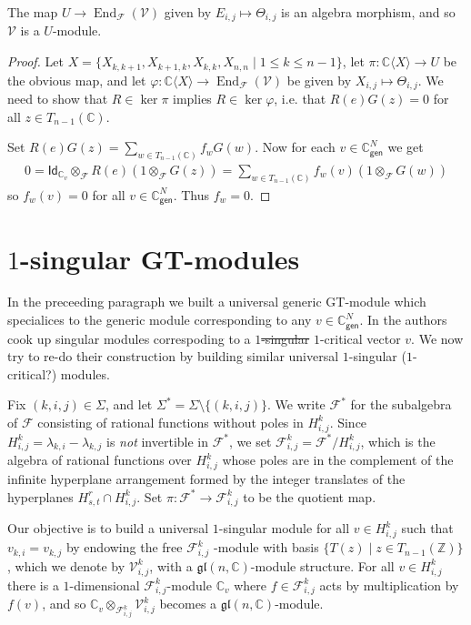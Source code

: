 \documentclass[11pt,fleqn]{article}
\newcommand\CC{\mathbb C}
\newcommand\ZZ{\mathbb Z}
\newcommand\F{\mathcal F}
\newcommand\V{\mathcal V}
\newcommand\ot{\otimes}
\renewcommand\to{\longrightarrow}
\renewcommand\phi{\varphi}
\newcommand\Id{\mathsf{Id}}
\newcommand\gl{\mathfrak{gl}}
\newcommand\gen{\mathsf{gen}}
\DeclareMathOperator\End{End}
\begin{document}
\begin{Proposition*}
The map $U \to \End_\F(\V)$ given by $E_{i,j} \mapsto \Theta_{i,j}$ is an 
algebra morphism, and so $\V$ is a $U$-module.
\end{Proposition*}
\begin{proof}
Let $X = \{X_{k,k+1}, X_{k+1,k}, X_{k,k}, X_{n,n} \mid 1 \leq k \leq n-1\}$, 
let $\pi: \CC \langle X \rangle \to U$ be the obvious map, and let $\phi: \CC 
\langle X\rangle \to \End_\F(\V)$ be given by $X_{i,j} \mapsto 
\Theta_{i,j}$. We 
need to show that $R \in \ker \pi$ implies $R \in \ker \phi$, i.e. that 
$R(e)G(z) = 0$ for all $z \in T_{n-1}(\CC)$.

Set $R(e)G(z) = \sum_{w \in T_{n-1}(\CC)} f_w G(w)$. Now for each $v \in 
\CC_\gen^N$ we get
\begin{align*}
0 = \Id_{\CC_v} \ot_\F R(e) (1 \ot_\F G(z)) = \sum_{w \in T_{n-1}(\CC)} 
f_w(v)(1 \ot_\F G(w))
\end{align*}
so $f_w(v) = 0$ for all $v \in \CC^N_\gen$. Thus $f_w = 0$.
\end{proof}

\section{$1$-singular GT-modules}

In the preceeding paragraph we built a universal generic GT-module which 
specialices to the generic module corresponding to any $v \in \CC^N_\gen$. In 
\cite{FGR} the authors cook up singular modules correspoding to a 
\sout{$1$-singular} $1$-critical vector $v$. We now try to re-do their 
construction by building similar universal $1$-singular ($1$-critical?)
modules. 

Fix $(k,i,j) \in \Sigma$, and let $\Sigma^* = \Sigma \setminus \{(k,i,j)\}$.
We write $\F^*$ for the subalgebra of $\F$ consisting of rational functions 
without poles in $H^k_{i,j}$. Since $H^k_{i,j} = \lambda_{k,i} - \lambda_{k,j}$
is \emph{not} invertible in $\F^*$, we set $\F_{i,j}^k = \F^*/H^k_{i,j}$, 
which is the algebra of rational functions over $H^k_{i,j}$ whose poles are in 
the complement of the infinite hyperplane arrangement formed by the integer 
translates of the hyperplanes $H^r_{s,t} \cap H^k_{i,j}$. Set $\pi: \F^* \to 
\F_{i,j}^k$ to be the quotient map.

Our objective is to build a universal $1$-singular module for all $v \in 
H^k_{i,j}$ such that $v_{k,i} = v_{k,j}$ by endowing the free $\F_{i,j}^k$
-module with basis $\{T(z) \mid z \in T_{n-1}(\ZZ)\}$, which we denote by
$\V_{i,j}^k$, with a $\gl(n,\CC)$-module structure. For all $v \in H^k_{i,j}$
there is a $1$-dimensional $\F_{i,j}^k$-module $\CC_v$ where $f \in 
\F_{i,j}^k$ acts by multiplication by $f(v)$, and so $\CC_v \ot_{\F_{i,j}^k} 
\V^k_{i,j}$ becomes a $\gl(n,\CC)$-module.
\end{document}
